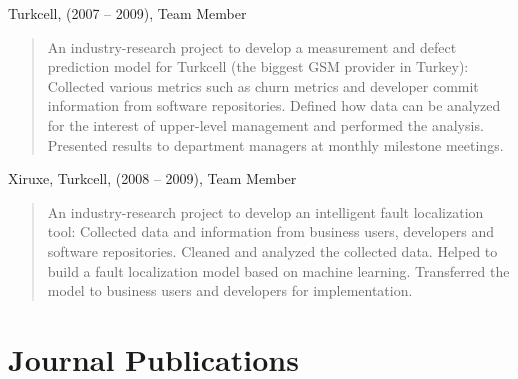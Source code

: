 \documentclass[margin]{res}
\begin{document}
\begin{resume}
\begin{list}{}{\leftmargin=0.5em}
\item Turkcell, (2007 -- 2009), Team Member
\begin{quote}
An industry-research project to develop a measurement and defect prediction model for Turkcell (the biggest GSM provider in Turkey): Collected various metrics such as churn metrics and developer commit information from software repositories. Defined how data can be analyzed for the interest of upper-level management and performed the analysis. Presented results to department managers at monthly milestone meetings.
\end{quote}


\item Xiruxe, Turkcell, (2008 -- 2009), Team Member
\begin{quote}
An industry-research project to develop an intelligent fault localization tool: 
Collected data and information from business users, developers and software repositories.
Cleaned and analyzed the collected data. Helped to build a fault localization model based on machine learning. Transferred the model to business users and developers for implementation.
\end{quote}

\end{list}

\section{Journal Publications}


\end{resume}
\end{document}
